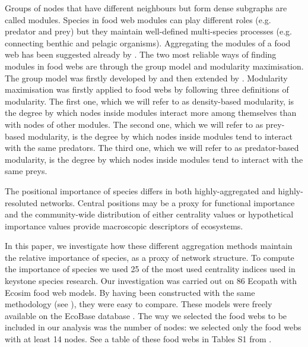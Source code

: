 \documentclass[twocolumn]{article}
\begin{document}
	Groups of nodes that have different neighbours but form dense subgraphs are called modules. Species in food web modules can play different roles (e.g. predator and prey) but they maintain well-defined multi-species processes (e.g. connecting benthic and pelagic organisms). Aggregating the modules of a food web has been suggested already by \citet{Allesina2009a}. The two most reliable ways of finding modules in food webs are through the group model and modularity maximisation. The group model was firstly developed by \citet{Allesina2009a} and then extended by \citet{Sander2015}.	Modularity maximisation was firstly applied to food webs by \citet{Guimera2010} following three definitions of modularity.	The first one, which we will refer to as density-based modularity, is the degree by which nodes inside modules interact more among themselves than with nodes of other modules.	The second one, which we will refer to as prey-based modularity, is the degree by which nodes inside modules tend to interact with the same predators.	The third one, which we will refer to as predator-based modularity, is the degree by which nodes inside modules tend to interact with the same preys.

	The positional importance of species differs in both highly-aggregated and highly-resoluted networks. Central positions may be a proxy for functional importance and the community-wide distribution of either centrality values \citep{Bauer2010} or hypothetical importance values \citep{Mills1993} provide macroscopic descriptors of ecosystems.

	In this paper, we investigate how these different aggregation methods maintain the relative importance of species, as a proxy of network structure.
	To compute the importance of species we used 25 of the most used centrality indices used in keystone species research.
	Our investigation was carried out on 86 Ecopath with Ecosim food web models. By having been constructed with the same methodology (see \citet{Okey2004}), they were easy to compare. These models were freely available on the EcoBase database \citep{Colleter2013}. The way we selected the food webs to be included in our analysis was the number of nodes: we selected only the food webs with at least 14 nodes.  See a table of these food webs in Tables S1 from \citet{Heymans2014}. %
\end{document}
